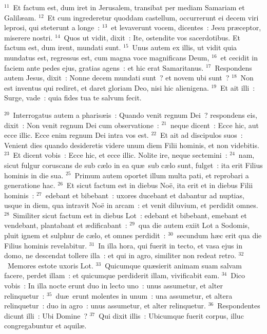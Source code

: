 ${}^{11}$~Et factum est, dum iret in Jerusalem, transibat per mediam Samariam et Galil\ae am.
${}^{12}$~Et cum ingrederetur quoddam castellum, occurrerunt ei decem viri leprosi, qui steterunt a longe~:
${}^{13}$~et levaverunt vocem, dicentes~: Jesu pr\ae ceptor, miserere nostri.
${}^{14}$~Quos ut vidit, dixit~: Ite, ostendite vos sacerdotibus. Et factum est, dum irent, mundati sunt.
${}^{15}$~Unus autem ex illis, ut vidit quia mundatus est, regressus est, cum magna voce magnificans Deum,
${}^{16}$~et cecidit in faciem ante pedes ejus, gratias agens~: et hic erat Samaritanus.
${}^{17}$~Respondens autem Jesus, dixit~: Nonne decem mundati sunt~? et novem ubi sunt~?
${}^{18}$~Non est inventus qui rediret, et daret gloriam Deo, nisi hic alienigena.
${}^{19}$~Et ait illi~: Surge, vade~: quia fides tua te salvum fecit.


${}^{20}$~Interrogatus autem a pharis\ae is~: Quando venit regnum Dei~? respondens eis, dixit~: Non venit regnum Dei cum observatione~:
${}^{21}$~neque dicent~: Ecce hic, aut ecce illic. Ecce enim regnum Dei intra vos est.
${}^{22}$~Et ait ad discipulos suos~: Venient dies quando desideretis videre unum diem Filii hominis, et non videbitis.
${}^{23}$~Et dicent vobis~: Ecce hic, et ecce illic. Nolite ire, neque sectemini~:
${}^{24}$~nam, sicut fulgur coruscans de sub c\ae lo in ea qu\ae\ sub c\ae lo sunt, fulget~: ita erit Filius hominis in die sua.
${}^{25}$~Primum autem oportet illum multa pati, et reprobari a generatione hac.
${}^{26}$~Et sicut factum est in diebus No\"e, ita erit et in diebus Filii hominis~:
${}^{27}$~edebant et bibebant~: uxores ducebant et dabantur ad nuptias, usque in diem, qua intravit No\"e in arcam~: et venit diluvium, et perdidit omnes.
${}^{28}$~Similiter sicut factum est in diebus Lot~: edebant et bibebant, emebant et vendebant, plantabant et \ae dificabant~:
${}^{29}$~qua die autem exiit Lot a Sodomis, pluit ignem et sulphur de c\ae lo, et omnes perdidit~:
${}^{30}$~secundum h\ae c erit qua die Filius hominis revelabitur.
${}^{31}$~In illa hora, qui fuerit in tecto, et vasa ejus in domo, ne descendat tollere illa~: et qui in agro, similiter non redeat retro.
${}^{32}$~Memores estote uxoris Lot.
${}^{33}$~Quicumque qu\ae sierit animam suam salvam facere, perdet illam~: et quicumque perdiderit illam, vivificabit eam.
${}^{34}$~Dico vobis~: In illa nocte erunt duo in lecto uno~: unus assumetur, et alter relinquetur~:
${}^{35}$~du\ae\ erunt molentes in unum~: una assumetur, et altera relinquetur~: duo in agro~: unus assumetur, et alter relinquetur.
${}^{36}$~Respondentes dicunt illi~: Ubi Domine~?
${}^{37}$~Qui dixit illis~: Ubicumque fuerit corpus, illuc congregabuntur et aquil\ae .

